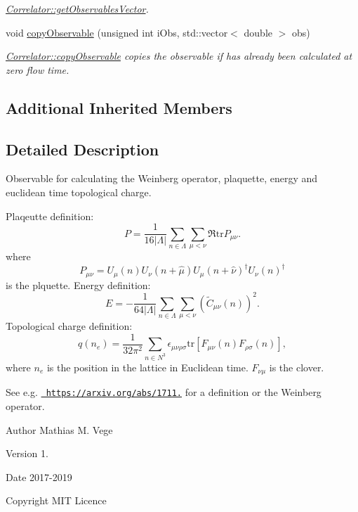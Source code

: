 \begin{DoxyCompactItemize}
\begin{DoxyCompactList}\small\item\em \mbox{\hyperlink{class_correlator_a7fb062b098beb078f3e546f4717b4941}{Correlator\+::get\+Observables\+Vector}}. \end{DoxyCompactList}\item 
void \mbox{\hyperlink{class_super_sampler_a9f9155a519b2f60f029e92f641f54c9c}{copy\+Observable}} (unsigned int i\+Obs, std\+::vector$<$ double $>$ obs)
\begin{DoxyCompactList}\small\item\em \mbox{\hyperlink{class_correlator_ac780d8b180294ee4801ede6e6a13f7f4}{Correlator\+::copy\+Observable}} copies the observable if has already been calculated at zero flow time. \end{DoxyCompactList}\end{DoxyCompactItemize}
\subsection*{Additional Inherited Members}


\subsection{Detailed Description}
Observable for calculating the Weinberg operator, plaquette, energy and euclidean time topological charge. 

Plaqeutte definition\+: \[ P = \frac{1}{16|\Lambda|} \sum_{n\in\Lambda} \sum_{\mu < \nu} \Re \mathrm{tr} P_{\mu\nu}. \] where \[ P_{\mu\nu}=U_\mu(n) U_{\nu}(n+\hat{\mu}) U_{\mu}(n+\hat{\nu})^\dagger U_{\nu} (n)^\dagger \] is the plquette. Energy definition\+: \[ E = -\frac{1}{64|\Lambda|} \sum_{n\in\Lambda} \sum_{\mu<\nu} \left(\tilde{C}_{\mu\nu}(n)\right)^2. \] Topological charge definition\+: \[ q(n_e) = \frac{1}{32\pi^2} \sum_{n\in N^3} \epsilon_{\mu\nu\rho\sigma} \mathrm{tr}\left[F_{\mu\nu}(n)F_{\rho\sigma}(n)\right], \] where $n_e$ is the position in the lattice in Euclidean time. $F_{\nu\mu}$ is the clover.

See e.\+g. \href{https://arxiv.org/abs/1711.04730}{\texttt{ https\+://arxiv.\+org/abs/1711.}} for a definition or the Weinberg operator.

\begin{DoxyAuthor}{Author}
Mathias M. Vege 
\end{DoxyAuthor}
\begin{DoxyVersion}{Version}
1. 
\end{DoxyVersion}
\begin{DoxyDate}{Date}
2017-\/2019 
\end{DoxyDate}
\begin{DoxyCopyright}{Copyright}
M\+IT Licence 
\end{DoxyCopyright}


